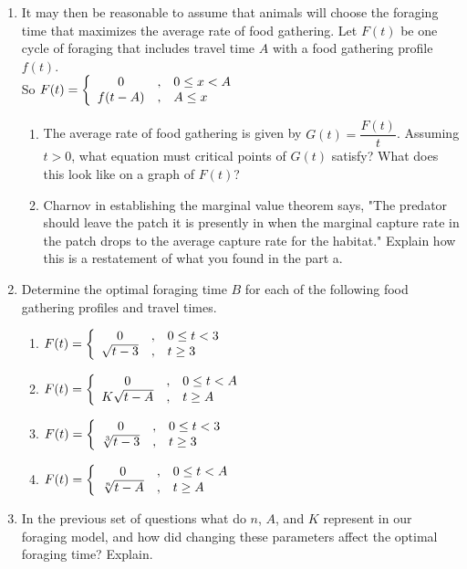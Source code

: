 \documentclass{amsbook}
\begin{document}
\begin{enumerate}
\begin{enumerate}
\begin{tabular}{c|c|c|c}
		\end{tabular}
		\item Which foraging time seems optimal? Why?
	\end{enumerate}
	\newpage
	\item It may then be reasonable to assume that animals will choose the foraging time that maximizes the average rate of food gathering. Let $F(t)$ be one cycle of foraging that includes travel time $A$ with a food gathering profile $f(t)$.\\
	So $F(t)=\left\{ \begin{array}{c c l} 0 &,& 0\leq x < A\\ f(t-A) &,& A \leq x \end{array}\right.$
	\begin{enumerate}
	\item The average rate of food gathering is given by $G(t)=\dfrac{F(t)}{t}$. Assuming $t>0$, what equation must critical points of $G(t)$ satisfy? What does this look like on a graph of $F(t)$?
	\item Charnov in establishing the marginal value theorem says, "The predator should leave the patch it is presently in when the marginal capture rate in the patch drops to the average capture rate for the habitat." Explain how this is a restatement of what you found in the part a.
	\end{enumerate}
\item Determine the optimal foraging time $B$ for each of the following food gathering profiles and travel times.
	\begin{enumerate}
		\item $F(t)=\left\{ \begin{array}{c c l} 0 &,&0\leq t <3\\ \sqrt{t-3} &,& t\geq 3 \end{array}\right.$
		\item $F(t)=\left\{ \begin{array}{c c l} 0 &,& 0\leq t<A\\ K\sqrt{t-A} &,& t\geq A \end{array}\right.$
		\item $F(t)=\left\{ \begin{array}{c c l} 0 &,&0\leq t <3\\ \sqrt[3]{t-3} &,& t\geq 3 \end{array}\right.$
		\item $F(t)=\left\{ \begin{array}{c c l} 0 &,&0\leq t <A\\ \sqrt[n]{t-A} &,& t\geq A \end{array}\right.$
	\end{enumerate}
\item In the previous set of questions what do $n$, $A$, and $K$ represent in our foraging model, and how did changing these parameters affect the optimal foraging time? Explain.
\end{enumerate}
\end{document}
